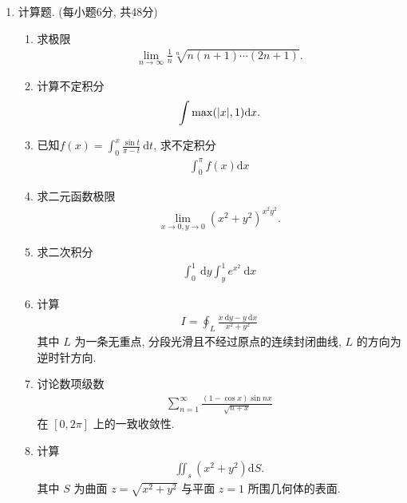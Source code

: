 \documentclass[space]{ctexart} %
\begin{document}
\vspace*{0.5cm}
\begin{enumerate}[itemsep=1.5em,label=\arabic*.,topsep=0pt,left=0em]
\item 计算题. (每小题6分, 共48分)


\setcounter{enumii}{0}
\begin{enumerate}[itemsep=1em,label=(\arabic*),topsep=0pt,left=2em] %
	\item 求极限
\begin{align*}
\lim\limits_{n \rightarrow \infty} \frac{1}{n} \sqrt[n]{n(n+1) \cdots(2 n+1)}.
\end{align*}

    \item 计算不定积分
    \begin{align*}
      \int \max (|x|, 1) {\rm d} x.
    \end{align*}


   \item 已知$f(x)=\displaystyle{\int_{0}^{x}} \frac{\sin t}{\pi-t} \mathrm{~d} t$, 求不定积分
   \begin{align*}
   \int_{0}^{\pi} f(x) \mathrm{d} x
   \end{align*}

    \item 求二元函数极限
\begin{align*}
\lim\limits_{x \rightarrow 0, y \rightarrow 0}\left(x^{2}+y^{2}\right)^{x^{2} y^{2}}.
\end{align*}

  \item 求二次积分
  \begin{align*}
  \int_{0}^{1} \mathrm{~d} y \int_{y}^{1} e^{x^{2}} \mathrm{~d} x
  \end{align*}

  \item 计算
  \begin{align*}
  I=\oint_{L} \frac{x \mathrm{~d} y-y \mathrm{~d} x}{x^{2}+y^{2}}
  \end{align*}
其中  $L$ 为一条无重点, 分段光滑且不经过原点的连续封闭曲线, $L$ 的方向为逆时针方向.

\item 讨论数项级数
  \begin{align*}
 \sum_{n=1}^{\infty} \frac{(1-\cos x) \sin n x}{\sqrt{n+x}}
  \end{align*}
在  $[0,2\pi]$ 上的一致收敛性.

\item 计算
  \begin{align*}
 \iint_{s}\left(x^{2}+y^{2}\right) \mathrm{d} S.
  \end{align*}
其中 $S$ 为曲面  $z=\sqrt{x^{2}+y^{2}}$ 与平面 $z=1$ 所围几何体的表面.


\end{enumerate}
\end{enumerate}
\end{document}
